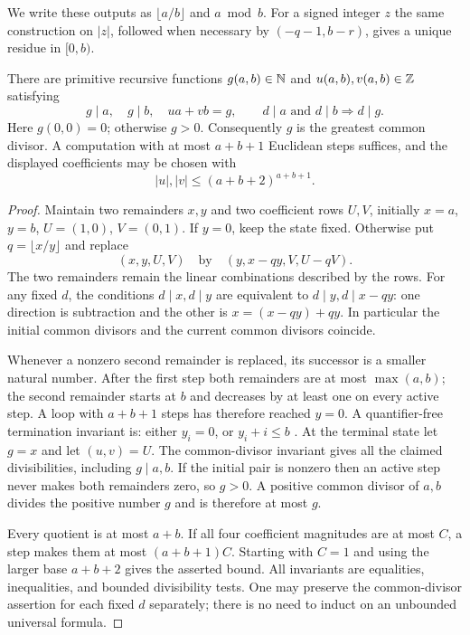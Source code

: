 We write these outputs as $\lfloor a/b\rfloor$ and $a\bmod b$.
For a signed integer $z$ the same construction on $|z|$, followed when
necessary by $(-q-1,b-r)$, gives a unique residue in $[0,b)$.

\begin{theorem}
\label{el:bezout}
There are primitive recursive functions $g(a,b)\in\mathbb N$ and
$u(a,b),v(a,b)\in\mathbb Z$ satisfying
\[
 g\mid a,\quad g\mid b,\quad ua+vb=g,
 \qquad d\mid a\text{ and }d\mid b\Longrightarrow d\mid g.
\]
Here $g(0,0)=0$; otherwise $g>0$.  Consequently $g$ is the greatest
common divisor.  A computation with at most $a+b+1$ Euclidean steps
suffices, and the displayed coefficients may be chosen with
\[
 |u|,|v|\le (a+b+2)^{a+b+1}.
\]
\end{theorem}
\begin{proof}
Maintain two remainders $x,y$ and two coefficient rows $U,V$, initially
$x=a$, $y=b$, $U=(1,0)$, $V=(0,1)$.  If $y=0$, keep the state fixed.
Otherwise put $q=\lfloor x/y\rfloor$ and replace
\[
 (x,y,U,V)\quad\text{by}\quad(y,x-qy,V,U-qV).
\]
The two remainders remain the linear combinations described by the rows.
For any fixed $d$, the conditions $d\mid x,d\mid y$ are equivalent to
$d\mid y,d\mid x-qy$: one direction is subtraction and the other is
$x=(x-qy)+qy$.  In particular the initial common divisors and the current
common divisors coincide.

Whenever a nonzero second remainder is replaced, its successor is a
smaller natural number.  After the first step both remainders are at most
$\max(a,b)$; the second remainder starts at $b$ and decreases by at least
one on every active step.  A loop with $a+b+1$ steps has therefore reached
$y=0$.  A quantifier-free termination invariant is: either $y_i=0$, or
$y_i+i\le b$ .
At the terminal state let $g=x$ and let $(u,v)=U$.  The common-divisor
invariant gives all the claimed divisibilities, including $g\mid a,b$.
If the initial pair is nonzero then an active step never makes both
remainders zero, so $g>0$.  A positive common divisor of $a,b$ divides
the positive number $g$ and is therefore at most $g$.

Every quotient is at most $a+b$.  If all four coefficient magnitudes are
at most $C$, a step makes them at most $(a+b+1)C$.  Starting with $C=1$
and using the larger base $a+b+2$ gives the asserted bound.  All invariants
are equalities, inequalities, and bounded divisibility tests.  One may
preserve the common-divisor assertion for each fixed $d$ separately;
there is no need to induct on an unbounded universal formula.
\end{proof}


